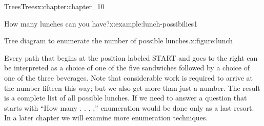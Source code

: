\documentclass[twoside,10pt,]{book}
\numberwithin{equation}{section}
\begin{document}
\begin{chapterptx}{Trees}{}{Trees}{}{}{x:chapter:chapter_10}
\begin{example}{How many lunches can you have?}{x:example:lunch-possibilies1}
\begin{figureptx}{Tree diagram to enumerate the number of possible lunches.}{x:figure:lunch}{}
\begin{image}{0.25}{0.5}{0.25}
\end{image}%
\tcblower
\end{figureptx}%
Every path that begins at the position labeled START and goes to the right can be interpreted as a choice of one of the five sandwiches followed by a choice of one of the three beverages. Note that considerable work is required to arrive at the number fifteen this way; but we also get more than just a number. The result is a complete list of all possible lunches. If we need to answer a question that starts with ``How many . . . ,'' enumeration would be done only as a last resort. In a later chapter we will examine more enumeration techniques.%
\end{example}
\end{chapterptx}
%
%
\typeout{************************************************}
\typeout{************************************************}
%
\end{document}

